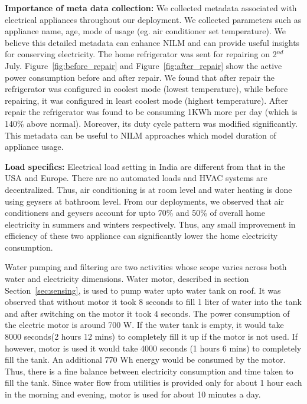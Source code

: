 \documentclass[10pt]{sensys-proc}
\newcommand{\figref}[1]{Figure~\ref{#1}}
\newcommand{\secref}[1]{Section~\ref{#1}}
\begin{document}
\noindent \textbf{Importance of meta data collection:} We collected metadata associated with electrical appliances throughout our deployment. We collected parameters such as appliance name, age, mode of usage (eg. air conditioner set temperature). We believe this detailed metadata can enhance NILM and can provide useful insights for conserving electricity. The home refrigerator was sent for repairing on 2$^{nd}$ July. \figref{fig:before_repair} and \figref{fig:after_repair} show the active power consumption before and after repair. We found that after repair the refrigerator was configured in coolest mode (lowest temperature), while before repairing, it was configured in least coolest mode (highest temperature). After repair the refrigerator was found to be consuming 1KWh more per day (which is 140\% above normal). Moreover, its duty cycle pattern was modified significantly. This metadata can be useful to NILM approaches which model duration of appliance usage.

\noindent \textbf{Load specifics:} Electrical load setting in India are different from that in the USA and Europe. There are no automated loads and HVAC systems are decentralized. Thus, air conditioning is at room level and water heating is done using geysers at bathroom level. From our deployments, we observed that air conditioners and geysers account for upto 70\% and 50\% of overall home electricity in summers and winters respectively. Thus, any small improvement in efficiency of these two appliance can significantly lower the home electricity consumption.


\noindent Water pumping and filtering are two activities whose scope varies across both water and electricity dimensions. Water motor, described in section \secref{sec:sensing}, is used to pump water upto water tank on roof. It was observed that without motor it took 8 seconds to fill 1 liter of water into the tank and after switching on the motor it took 4 seconds. The power consumption of the electric motor is around 700 W. If the water tank is empty, it would take 8000 seconds(2 hours 12 mins) to completely fill it up if the motor is not used. If however, motor is used it would take 4000 seconds (1 hours 6 mins) to completely fill the tank. An additional 770 Wh energy would be consumed by the motor. Thus, there is a fine balance between electricity consumption and time taken to fill the tank. Since water flow from utilities is provided only for about 1 hour each in the morning and evening, motor is used for about 10 minutes a day.
\end{document}
